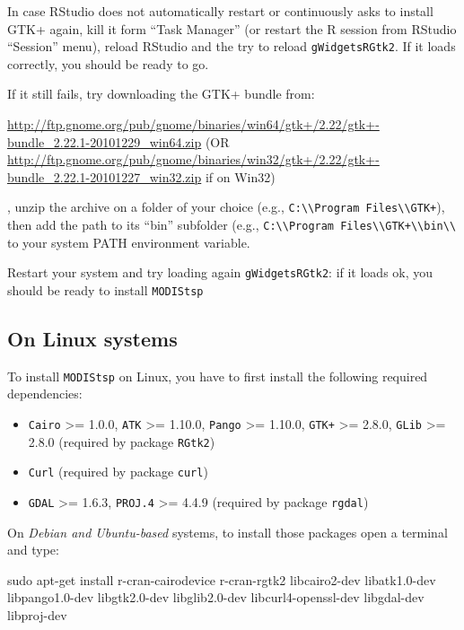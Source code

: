 \documentclass[]{article}
\newenvironment{Shaded}{\begin{snugshade}}{\end{snugshade}}
\newcommand{\FunctionTok}[1]{\textcolor[rgb]{0.00,0.00,0.00}{#1}}
\newcommand{\ExtensionTok}[1]{#1}
\newcommand{\NormalTok}[1]{#1}
\providecommand{\tightlist}{%
  \setlength{\itemsep}{0pt}\setlength{\parskip}{0pt}}
\begin{document}
In case RStudio does not automatically restart or continuously asks to
install GTK+ again, kill it form ``Task Manager'' (or restart the R
session from RStudio ``Session'' menu), reload RStudio and the try to
reload \texttt{gWidgetsRGtk2}. If it loads correctly, you should be
ready to go.

If it still fails, try downloading the GTK+ bundle from:

\url{http://ftp.gnome.org/pub/gnome/binaries/win64/gtk+/2.22/gtk+-bundle_2.22.1-20101229_win64.zip}
(OR
\url{http://ftp.gnome.org/pub/gnome/binaries/win32/gtk+/2.22/gtk+-bundle_2.22.1-20101227_win32.zip}
if on Win32)

, unzip the archive on a folder of your choice (e.g.,
\texttt{C:\textbackslash{}\textbackslash{}Program\ Files\textbackslash{}\textbackslash{}GTK+}),
then add the path to its ``bin'' subfolder (e.g.,
\texttt{C:\textbackslash{}\textbackslash{}Program\ Files\textbackslash{}\textbackslash{}GTK+\textbackslash{}\textbackslash{}bin\textbackslash{}\textbackslash{}}
to your system PATH environment variable.

Restart your system and try loading again \texttt{gWidgetsRGtk2}: if it
loads ok, you should be ready to install \texttt{MODIStsp}

\subsection{On Linux systems}\label{on-linux-systems}

To install \texttt{MODIStsp} on Linux, you have to first install the
following required dependencies:

\begin{itemize}
\tightlist
\item
  \texttt{Cairo} \textgreater{}= 1.0.0, \texttt{ATK} \textgreater{}=
  1.10.0, \texttt{Pango} \textgreater{}= 1.10.0, \texttt{GTK+}
  \textgreater{}= 2.8.0, \texttt{GLib} \textgreater{}= 2.8.0 (required
  by package \texttt{RGtk2})
\item
  \texttt{Curl} (required by package \texttt{curl})
\item
  \texttt{GDAL} \textgreater{}= 1.6.3, \texttt{PROJ.4} \textgreater{}=
  4.4.9 (required by package \texttt{rgdal})
\end{itemize}

On \emph{Debian and Ubuntu-based} systems, to install those packages
open a terminal and type:

\begin{Shaded}
\begin{Highlighting}[]
\FunctionTok{sudo}\NormalTok{ apt-get install r-cran-cairodevice r-cran-rgtk2 libcairo2-dev libatk1.0-dev libpango1.0-dev }
\ExtensionTok{libgtk2.0-dev}\NormalTok{ libglib2.0-dev libcurl4-openssl-dev libgdal-dev libproj-dev}
\end{Highlighting}
\end{Shaded}
\end{document}
